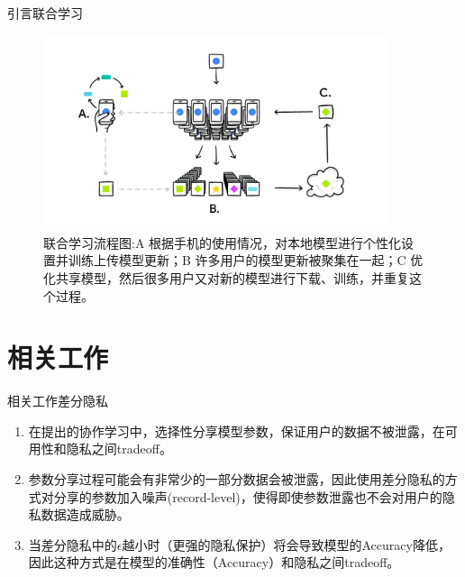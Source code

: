 \documentclass[aspectratio=169]{beamer}
\begin{document}
\begin{frame}{引言}{联合学习}
\begin{figure}[!ht]
\centering
\includegraphics[width = 4in]{fig/FederatedLearningFlow}
\caption{联合学习流程图:A 根据手机的使用情况，对本地模型进行个性化设置并训练上传模型更新；B 许多用户的模型更新被聚集在一起；C 优化共享模型，然后很多用户又对新的模型进行下载、训练，并重复这个过程。}
\label{fig:Google}
\end{figure}
\end{frame}

\section{相关工作}
\begin{frame}{相关工作}{差分隐私}
\begin{enumerate}
\item 在\cite{shokri2015privacy}提出的协作学习中，选择性分享模型参数，保证用户的数据不被泄露，在可用性和隐私之间tradeoff。

\item 参数分享过程可能会有非常少的一部分数据会被泄露，因此使用差分隐私的方式对分享的参数加入噪声(record-level)，使得即使参数泄露也不会对用户的隐私数据造成威胁。

\item 当差分隐私中的$\epsilon$越小时（更强的隐私保护）将会导致模型的Accuracy降低，因此这种方式是在模型的准确性（Accuracy）和隐私之间tradeoff。
\end{enumerate}
\end{frame}
\end{document}
